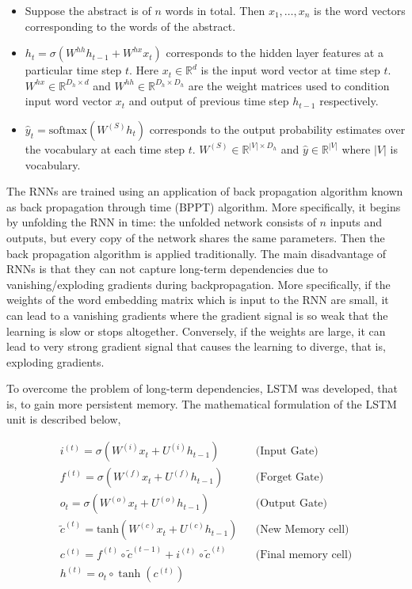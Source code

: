 \begin{itemize}
	\item Suppose the abstract is of $n$ words in total. Then $x_1, \ldots, x_n$ is the word vectors corresponding to the words of the abstract.

	\item $h_t = \sigma(W^{hh}h_{t-1} + W^{hx}x_t)$ corresponds to the hidden layer features at a particular time step $t$. Here $x_t \in \mathbb{R}^d$ is the input word vector at time step $t$. $W^{hx} \in \mathbb{R}^{D_h \times d}$ and $W^{hh} \in \mathbb{R}^{D_h \times D_h}$ are the weight matrices used to condition input word vector $x_t$ and output of previous time step $h_{t-1}$ respectively.

	\item $\widehat{y}_t = \text{softmax}(W^{(S)} h_t)$ corresponds to the output probability estimates over the vocabulary at each time step $t$. $W^{(S)} \in \mathbb{R}^{|V| \times D_h}$ and $\widehat{y} \in \mathbb{R}^{|V|}$ where $|V|$ is vocabulary.


\end{itemize}

The RNNs are trained using an application of back propagation algorithm known as back propagation through time (BPPT) algorithm. More specifically, it begins by unfolding the RNN in time: the unfolded network consists of $n$ inputs and outputs, but every copy of the network shares the same parameters. Then the back propagation algorithm is applied traditionally. The main disadvantage of RNNs is that they can not capture long-term dependencies due to vanishing/exploding gradients during backpropagation. More specifically, if the weights of the word embedding matrix which is input to the RNN are small, it can lead to a vanishing gradients where the gradient signal is so weak that the learning is slow or stops altogether. Conversely, if the weights are large, it can lead to very strong gradient signal that causes the learning to diverge, that is, exploding gradients.

To overcome the problem of long-term dependencies, LSTM was developed, that is, to gain more persistent memory. The mathematical formulation of the LSTM unit is described below,

\begin{equation}
\begin{aligned}
	i^{(t)} = \sigma(W^{(i)}x_t + U^{(i)}h_{t-1}) && \text{(Input \ Gate)} \\
	f^{(t)} = \sigma(W^{(f)}x_t + U^{(f)}h_{t-1}) && \text{(Forget \ Gate)} \\
	o_t = \sigma(W^{(o)}x_t + U^{(o)}h_{t-1}) && \text{(Output \ Gate)} \\
	\widetilde{c}^{(t)} = \text{tanh}(W^{(c)}x_t + U^{(c)}h_{t-1}) && \text{(New \ Memory \ cell)} \\
	c^{(t)} = f^{(t)} \circ \widetilde{c}^{(t-1)} + i^{(t)} \circ \widetilde{c}^{(t)} && \text{(Final \ memory \ cell)} \\
	h^{(t)} = o_t \circ \tanh(c^{(t)})
\end{aligned}
\end{equation}


